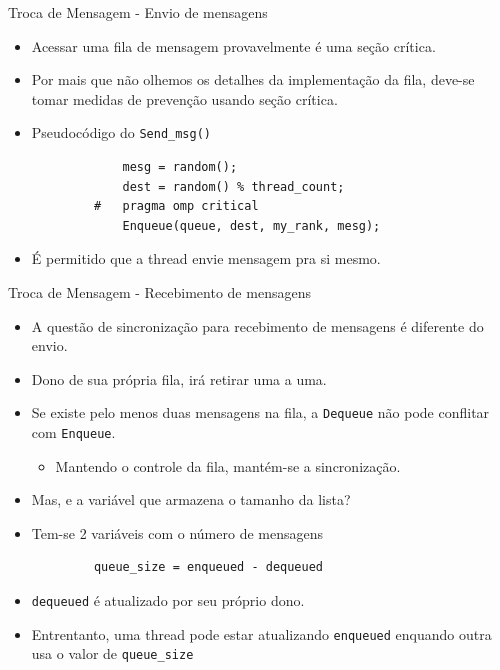 	\begin{frame}[fragile]{Troca de Mensagem -  Envio de mensagens}
		\begin{itemize}
			\item Acessar uma fila de mensagem provavelmente é uma seção crítica.
			\item Por mais que não olhemos os detalhes da implementação da fila, deve-se tomar medidas de prevenção usando seção crítica.
			\item Pseudocódigo do {\tt Send\_msg()}
		\end{itemize}
		\begin{verbatim}
				mesg = random();
				dest = random() % thread_count;
			#	pragma omp critical
				Enqueue(queue, dest, my_rank, mesg);
		\end{verbatim}
		\begin{itemize}
			\item É permitido que a thread envie mensagem pra si mesmo.
		\end{itemize}
\end{frame}
	\begin{frame}[fragile]{Troca de Mensagem -  Recebimento de mensagens}
		\begin{itemize}
			\item A questão de sincronização para recebimento de mensagens é diferente do envio.
			\item Dono de sua própria fila, irá retirar uma a uma.
			\item Se existe pelo menos duas mensagens na fila, a {\tt Dequeue} não pode conflitar com {\tt Enqueue}.
			\begin{itemize}
				\item Mantendo o controle da fila, mantém-se a sincronização.
			\end{itemize}
					\bigskip
			\item Mas, e a variável que armazena o tamanho da lista?
					\pause
			\item Tem-se 2 variáveis com o número de mensagens
		\end{itemize}
		\begin{verbatim}
			queue_size = enqueued - dequeued
		\end{verbatim}
		\begin{itemize}
			\item {\tt dequeued} é atualizado por seu próprio dono.
			\item Entrentanto, uma thread pode estar atualizando {\tt enqueued} enquando outra usa o valor de {\tt queue\_size}
		\end{itemize}
\end{frame}

